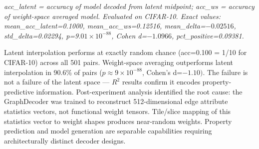 \begin{table}[htbp]
\centering
{}
\end{table}

\textit{acc\_latent = accuracy of model decoded from latent midpoint; acc\_ws = accuracy of weight-space averaged model. Evaluated on CIFAR-10. Exact values: mean\_acc\_latent=0.1000, mean\_acc\_ws=0.12516, mean\_delta=$-0.02516$, std\_delta=0.02294, p=9.$01\times 10^{-88}$, Cohen d=$-1.0966$, pct\_positive=0.09381.}

Latent interpolation performs at exactly random chance (acc=0.100 = 1/10 for CIFAR-10) across all 501 pairs. Weight-space averaging outperforms latent interpolation in 90.6\% of pairs ($p\approx 9\times 10^{-88}$, Cohen's d=$-1.10)$. The failure is not a failure of the latent space --- $R^2$ results confirm it encodes property-predictive information. Post-experiment analysis identified the root cause: the GraphDecoder was trained to reconstruct 512-dimensional edge attribute statistics vectors, not functional weight tensors. Tile/slice mapping of this statistics vector to weight shapes produces near-random weights. Property prediction and model generation are separable capabilities requiring architecturally distinct decoder designs.

